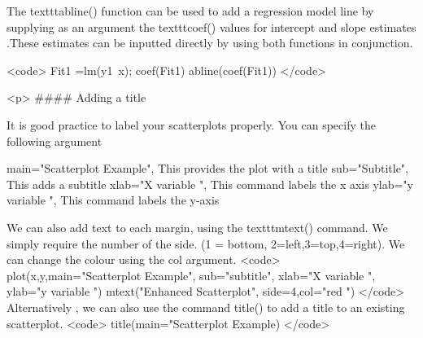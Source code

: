 The texttt{abline()} function can be used to add a regression model line  by supplying as an argument the texttt{coef()} values for intercept and slope estimates .These estimates can be inputted directly by using both functions in conjunction.

 <code>
Fit1 =lm(y1~x);  coef(Fit1)
abline(coef(Fit1))	
</code>

<p>
#### {Adding a title }

It is good practice to label your scatterplots properly. You can specify the following argument

      	main="Scatterplot Example", 	This provides the plot with a title
      	sub="Subtitle",   This adds a subtitle
      	xlab="X variable ",				This command labels the x axis 
  ylab="y variable ",				This command labels the y-axis

We can also add text to each margin, using the texttt{mtext()} command.  
We simply require the number of the side. (1 = bottom, 2=left,3=top,4=right). 
We can change the colour using the col argument.
 <code>
plot(x,y,main="Scatterplot Example",   sub="subtitle",    xlab="X variable ", ylab="y variable ")	
mtext("Enhanced Scatterplot", side=4,col="red ")
</code>
Alternatively , we can also use the command title() to add a title to an existing scatterplot.
 <code>
title(main="Scatterplot Example)	
</code>
